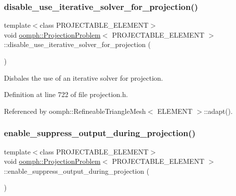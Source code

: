 \subsubsection{\texorpdfstring{disable\+\_\+use\+\_\+iterative\+\_\+solver\+\_\+for\+\_\+projection()}{disable\_use\_iterative\_solver\_for\_projection()}}
{\footnotesize\ttfamily template$<$class P\+R\+O\+J\+E\+C\+T\+A\+B\+L\+E\+\_\+\+E\+L\+E\+M\+E\+NT$>$ \\
void \hyperlink{classoomph_1_1ProjectionProblem}{oomph\+::\+Projection\+Problem}$<$ P\+R\+O\+J\+E\+C\+T\+A\+B\+L\+E\+\_\+\+E\+L\+E\+M\+E\+NT $>$\+::disable\+\_\+use\+\_\+iterative\+\_\+solver\+\_\+for\+\_\+projection (\begin{DoxyParamCaption}{ }\end{DoxyParamCaption})\hspace{0.3cm}{\ttfamily [inline]}}



Disbales the use of an iterative solver for projection. 



Definition at line 722 of file projection.\+h.



Referenced by oomph\+::\+Refineable\+Triangle\+Mesh$<$ E\+L\+E\+M\+E\+N\+T $>$\+::adapt().

\mbox{\label{classoomph_1_1ProjectionProblem_a3706c034e47193038de20f3d40443a2c}} 
\subsubsection{\texorpdfstring{enable\+\_\+suppress\+\_\+output\+\_\+during\+\_\+projection()}{enable\_suppress\_output\_during\_projection()}}
{\footnotesize\ttfamily template$<$class P\+R\+O\+J\+E\+C\+T\+A\+B\+L\+E\+\_\+\+E\+L\+E\+M\+E\+NT$>$ \\
void \hyperlink{classoomph_1_1ProjectionProblem}{oomph\+::\+Projection\+Problem}$<$ P\+R\+O\+J\+E\+C\+T\+A\+B\+L\+E\+\_\+\+E\+L\+E\+M\+E\+NT $>$\+::enable\+\_\+suppress\+\_\+output\+\_\+during\+\_\+projection (\begin{DoxyParamCaption}{ }\end{DoxyParamCaption})\hspace{0.3cm}{\ttfamily [inline]}}



